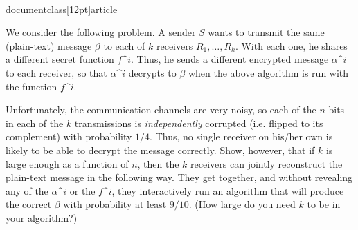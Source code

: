 \\documentclass[12pt]{article}
\begin{document}
\begin{enumerate}
We consider the following problem.
A sender $S$ wants to transmit the same (plain-text) message $\beta$
to each of $k$ receivers $R_1, \ldots, R_k$.
With each one, he shares a different secret function $f\^i$.
Thus, he sends a different encrypted message $\alpha\^i$ to each
receiver, so that $\alpha\^i$ decrypts to $\beta$ when the
above algorithm is run with the function $f\^i$.

Unfortunately, the communication channels are very noisy, so
each of the $n$ bits in each of the $k$ transmissions is
{\em independently} corrupted (i.e. flipped to its complement)
with probability $1/4$.
Thus, no single receiver on his/her own is likely to be able to decrypt
the message correctly.
Show, however, that if $k$ is large enough as a function of $n$,
then the $k$ receivers can jointly reconstruct the plain-text message
in the following way.
They get together, and without revealing any of the $\alpha\^i$
or the $f\^i$, they interactively run an algorithm
that will produce the correct $\beta$ with probability at least $9/10$.
(How large do you need $k$ to be in your algorithm?)

\end{enumerate}
\end{document}
